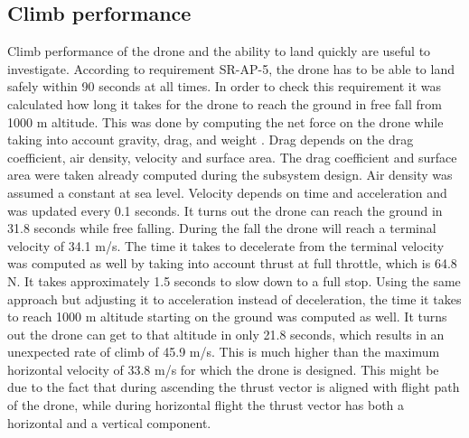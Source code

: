 \subsection{Climb performance}
Climb performance of the drone and the ability to land quickly are useful to investigate. According to requirement SR-AP-5, the drone has to be able to land safely within 90 seconds at all times. In order to check this requirement it was calculated how long it takes for the drone to reach the ground in free fall from 1000 m altitude. This was done by computing the net force on the drone while taking into account gravity, drag, and weight \cite{climbperformance}. Drag depends on the drag coefficient, air density, velocity and surface area. The drag coefficient and surface area were taken already computed during the subsystem design. Air density was assumed a constant at sea level. Velocity depends on time and acceleration and was updated every 0.1 seconds. It turns out the drone can reach the ground in 31.8 seconds while free falling. During the fall the drone will reach a terminal velocity of 34.1 m/s. The time it takes to decelerate from the terminal velocity was computed as well by taking into account thrust at full throttle, which is 64.8 N. It takes approximately 1.5 seconds to slow down to a full stop. Using the same approach but adjusting it to acceleration instead of deceleration, the time it takes to reach 1000 m altitude starting on the ground was computed as well. It turns out the drone can get to that altitude in only 21.8 seconds, which results in an unexpected rate of climb of 45.9 m/s. This is much higher than the maximum horizontal velocity of 33.8 m/s for which the drone is designed. This might be due to the fact that during ascending the thrust vector is aligned with flight path of the drone, while during horizontal flight the thrust vector has both a horizontal and a vertical component. 



